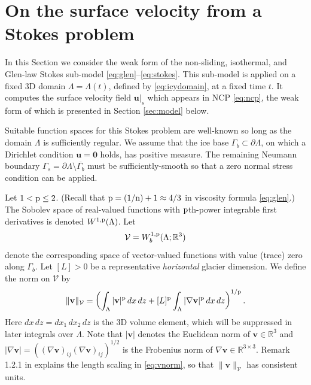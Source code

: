\documentclass[hidelinks,onefignum,onetabnum,final]{siamart220329}  %
\newcommand{\RR}{\mathbb{R}}
\newcommand{\grad}{\nabla}
\newcommand{\bu}{\mathbf{u}}
\newcommand{\bv}{\mathbf{v}}
\newcommand{\bzero}{\bm{0}}
\newcommand{\cV}{\mathcal{V}}
\newcommand{\nn}{{\text{\textnormal{n}}}}
\newcommand{\pp}{{\text{\textnormal{p}}}}
\begin{document}
\section{On the surface velocity from a Stokes problem} \label{sec:stokes}

In this Section we consider the weak form of the non-sliding, isothermal, and Glen-law Stokes sub-model \eqref{eq:glen}--\eqref{eq:stokes}.  This sub-model is applied on a fixed 3D domain $\Lambda = \Lambda(t)$, defined by \eqref{eq:icydomain}, at a fixed time $t$.  It computes the surface velocity field $\bu|_s$ which appears in NCP \eqref{eq:ncp}, the weak form of which is presented in Section \ref{sec:model} below.

Suitable function spaces for this Stokes problem are well-known so long as the domain $\Lambda$ is sufficiently regular.  We assume that the ice base $\Gamma_b\subset\partial \Lambda$, on which a Dirichlet condition $\bu=\bzero$ holds, has positive measure.  The remaining Neumann boundary $\Gamma_s = \partial \Lambda \setminus \overline{\Gamma_b}$ must be sufficiently-smooth so that a zero normal stress condition can be applied.

Let $1 < \pp \le 2$.  (Recall that $\pp=(1/\nn)+1\approx 4/3$ in viscosity formula \eqref{eq:glen}.)  The Sobolev space \cite{Evans2010} of real-valued functions with $\pp$th-power integrable first derivatives is denoted $W^{1,\pp}(\Lambda)$.  Let
\begin{equation}
\cV = W_b^{1,\pp}(\Lambda; \RR^3) \label{eq:defineV}
\end{equation}
denote the corresponding space of vector-valued functions with value (trace) zero along $\Gamma_b$.  Let $[L]>0$ be a representative \emph{horizontal} glacier dimension.  We define the norm on $\cV$ by
\begin{equation}
\|\bv\|_{\cV} = \left(\int_\Lambda |\bv|^\pp\,dx\,dz + [L]^\pp \int_\Lambda |\grad\bv|^\pp\,dx\,dz\right)^{1/\pp}. \label{eq:vnorm}
\end{equation}
Here $dx\,dz = dx_1\,dx_2\,dz$ is the 3D volume element, which will be suppressed in later integrals over $\Lambda$.  Note that $|\bv|$ denotes the Euclidean norm of $\bv\in\RR^3$ and $|\grad\bv|=\left((\grad\bv)_{ij} (\grad\bv)_{ij}\right)^{1/2}$ is the Frobenius norm of $\grad\bv\in\RR^{3\times 3}$.  Remark 1.2.1 in \cite{BoffiBrezziFortin2013} explains the length scaling in \eqref{eq:vnorm}, so that $\|\bv\|_{\cV}$ has consistent units.
\end{document}
